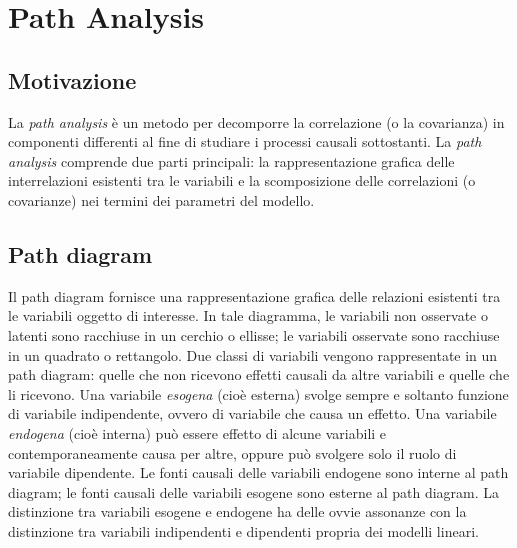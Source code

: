 
\chapter{Path Analysis}
\label{ch:path_analysis}


\section*{Motivazione}

La \emph{path analysis} è un metodo per decomporre la correlazione (o la covarianza) in componenti differenti al fine di studiare i processi causali sottostanti. 
La \emph{path analysis} comprende due parti principali: la rappresentazione grafica delle interrelazioni esistenti tra le variabili e  la scomposizione delle correlazioni (o covarianze) nei termini dei parametri del modello.


\section{Path diagram}

Il path diagram fornisce una rappresentazione grafica delle relazioni esistenti tra le variabili
oggetto di interesse.  In tale diagramma, le variabili non osservate o
latenti sono racchiuse in un cerchio o ellisse; le variabili osservate
sono racchiuse in un quadrato o rettangolo.
Due classi di variabili  vengono rappresentate in un path diagram:
quelle che non ricevono effetti causali da altre variabili e quelle
che li ricevono. Una variabile \emph{esogena} (cioè esterna) svolge
sempre e soltanto funzione di variabile indipendente, ovvero di
variabile che causa un effetto. Una variabile \emph{endogena} (cioè
interna) può essere effetto di alcune variabili e contemporaneamente
causa per altre, oppure può svolgere solo il ruolo di variabile
dipendente.  Le fonti causali delle variabili endogene sono
interne al path diagram; le fonti causali delle
variabili esogene sono esterne al path diagram. La distinzione tra variabili esogene e endogene ha delle
ovvie assonanze con la distinzione tra variabili indipendenti e
dipendenti propria dei modelli lineari.

